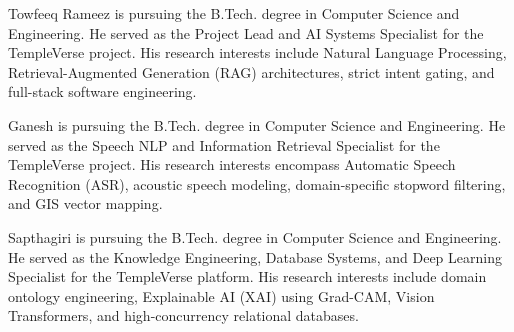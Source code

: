 \documentclass[lettersize,journal]{IEEEtran}
\begin{document}
\begin{IEEEbiography}{Towfeeq Rameez}
is pursuing the B.Tech. degree in Computer Science and Engineering. He served as the Project Lead and AI Systems Specialist for the TempleVerse project. His research interests include Natural Language Processing, Retrieval-Augmented Generation (RAG) architectures, strict intent gating, and full-stack software engineering.
\end{IEEEbiography}

\begin{IEEEbiography}{Ganesh}
is pursuing the B.Tech. degree in Computer Science and Engineering. He served as the Speech NLP and Information Retrieval Specialist for the TempleVerse project. His research interests encompass Automatic Speech Recognition (ASR), acoustic speech modeling, domain-specific stopword filtering, and GIS vector mapping.
\end{IEEEbiography}

\begin{IEEEbiography}{Sapthagiri}
is pursuing the B.Tech. degree in Computer Science and Engineering. He served as the Knowledge Engineering, Database Systems, and Deep Learning Specialist for the TempleVerse platform. His research interests include domain ontology engineering, Explainable AI (XAI) using Grad-CAM, Vision Transformers, and high-concurrency relational databases.
\end{IEEEbiography}
\end{document}

